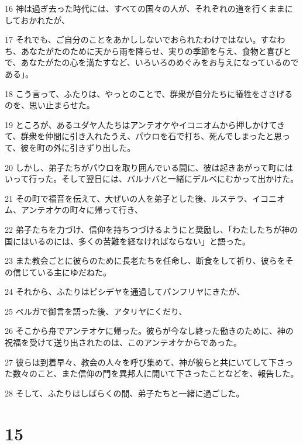 \par 16 神は過ぎ去った時代には、すべての国々の人が、それぞれの道を行くままにしておかれたが、
\par 17 それでも、ご自分のことをあかししないでおられたわけではない。すなわち、あなたがたのために天から雨を降らせ、実りの季節を与え、食物と喜びとで、あなたがたの心を満たすなど、いろいろのめぐみをお与えになっているのである」。
\par 18 こう言って、ふたりは、やっとのことで、群衆が自分たちに犠牲をささげるのを、思い止まらせた。
\par 19 ところが、あるユダヤ人たちはアンテオケやイコニオムから押しかけてきて、群衆を仲間に引き入れたうえ、パウロを石で打ち、死んでしまったと思って、彼を町の外に引きずり出した。
\par 20 しかし、弟子たちがパウロを取り囲んでいる間に、彼は起きあがって町にはいって行った。そして翌日には、バルナバと一緒にデルベにむかって出かけた。
\par 21 その町で福音を伝えて、大ぜいの人を弟子とした後、ルステラ、イコニオム、アンテオケの町々に帰って行き、
\par 22 弟子たちを力づけ、信仰を持ちつづけるようにと奨励し、「わたしたちが神の国にはいるのには、多くの苦難を経なければならない」と語った。
\par 23 また教会ごとに彼らのために長老たちを任命し、断食をして祈り、彼らをその信じている主にゆだねた。
\par 24 それから、ふたりはピシデヤを通過してパンフリヤにきたが、
\par 25 ペルガで御言を語った後、アタリヤにくだり、
\par 26 そこから舟でアンテオケに帰った。彼らが今なし終った働きのために、神の祝福を受けて送り出されたのは、このアンテオケからであった。
\par 27 彼らは到着早々、教会の人々を呼び集めて、神が彼らと共にいてして下さった数々のこと、また信仰の門を異邦人に開いて下さったことなどを、報告した。
\par 28 そして、ふたりはしばらくの間、弟子たちと一緒に過ごした。

\chapter{15}

